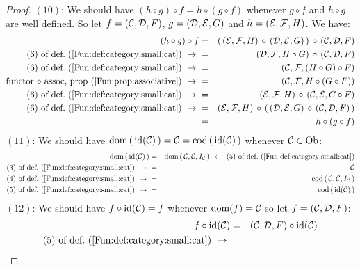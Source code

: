 \begin{proof}
    $(10)$: We should have $(h\circ g)\circ f = h\circ(g\circ f)$ whenever
    $g\circ f$ and $h\circ g$ are well defined. So let $f=(\mbox{$\cal C$},\mbox{$\cal D$},F)$,
    $g=(\mbox{$\cal D$},\mbox{$\cal E$},G)$ and $h=(\mbox{$\cal E$},{\cal F},H)$. We have:
        \begin{eqnarray*}(h\circ g)\circ f
            &=&(\,(\Eat,{\cal F},H)\,\circ\,(\Dat,\Eat,G)\,)\,
            \circ\,(\Cat,\Dat,F)\\
            \mbox{$(6)$ of def.~(\ref{Fun:def:category:small:cat})}\ \to\ 
            &=&(\Dat,{\cal F},H\circ G)\,\circ\,(\Cat,\Dat,F)\\
            \mbox{$(6)$ of def.~(\ref{Fun:def:category:small:cat})}\ \to\ 
            &=&(\Cat,{\cal F},(H\circ G)\circ F)\\
            \mbox{functor $\circ$ assoc, prop~(\ref{Fun:prop:associative})}
            \ \to\ 
            &=&(\Cat,{\cal F},H\circ (G\circ F))\\
            \mbox{$(6)$ of def.~(\ref{Fun:def:category:small:cat})}\ \to\ 
            &=&(\Eat,{\cal F},H)\,\circ\,(\Cat,\Eat,G\circ F)\\
            \mbox{$(6)$ of def.~(\ref{Fun:def:category:small:cat})}\ \to\ 
            &=&(\Eat,{\cal F},H)\,\circ\,(\,(\Dat,\Eat,G)\,
            \circ\,(\Cat,\Dat,F)\,)\\
            &=&h\circ(g\circ f)
        \end{eqnarray*}
    $(11)$: We should have $\mbox{\rm dom}\,(\,\mbox{\rm id}(\mbox{$\cal C$})\,) = \mbox{$\cal C$} = \mbox{\rm cod}\,(\,\mbox{\rm id}(\mbox{$\cal C$})\,)$
    whenever $\mbox{$\cal C$}\in\mbox{\rm Ob}$:
        \begin{eqnarray*}\dom\,(\,\id(\Cat)\,)
            &=&\dom\,(\,\Cat,\Cat, I_{\cal C}\,)
            \ \leftarrow\ \mbox{$(5)$ of def.~(\ref{Fun:def:category:small:cat})}\\
            \mbox{$(3)$ of def.~(\ref{Fun:def:category:small:cat})}\ \to\ 
            &=&\Cat\\
            \mbox{$(4)$ of def.~(\ref{Fun:def:category:small:cat})}\ \to\ 
            &=&\cod\,(\,\Cat,\Cat, I_{\cal C}\,)\\
            \mbox{$(5)$ of def.~(\ref{Fun:def:category:small:cat})}\ \to\ 
            &=&\cod\,(\,\id(\Cat)\,)
        \end{eqnarray*}
    $(12)$: We should have $f\circ\mbox{\rm id}(\mbox{$\cal C$})=f$ whenever $\mbox{\rm dom}(f)=\mbox{$\cal C$}$
    so let $f=(\mbox{$\cal C$},\mbox{$\cal D$},F)$:
        \begin{eqnarray*}f\circ\id(\Cat)
            &=&(\Cat,\Dat,F)\circ\id(\Cat)\\
            \mbox{$(5)$ of def.~(\ref{Fun:def:category:small:cat})}\ \to\ 

\end{eqnarray*}
\end{proof}
